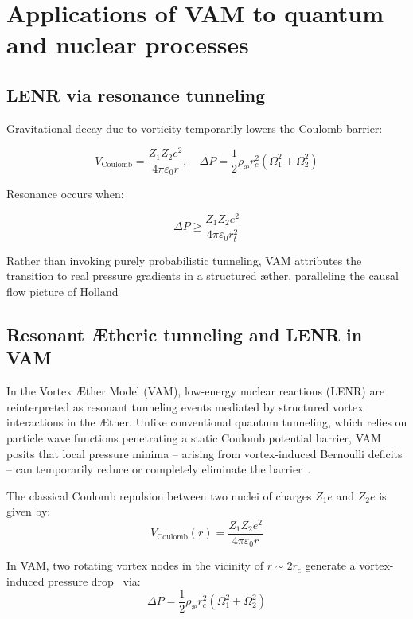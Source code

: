 \section{Applications of VAM to quantum and nuclear processes}
\label{sec:LENR_QED}
\subsection*{LENR via resonance tunneling}

Gravitational decay due to vorticity temporarily lowers the Coulomb barrier:

\begin{equation}
    V_\text{Coulomb} = \frac{Z_1 Z_2 e^2}{4\pi \varepsilon_0 r}, \quad \Delta P = \frac{1}{2} \rho_\text{\ae} r_c^2 (\Omega_1^2 + \Omega_2^2)
\end{equation}

Resonance occurs when:

\begin{equation}
    \Delta P \geq \frac{Z_1 Z_2 e^2}{4\pi \varepsilon_0 r_t^2}
\end{equation}

Rather than invoking purely probabilistic tunneling, VAM attributes the transition to real pressure gradients in a structured æther, paralleling the causal flow picture of Holland~\cite{holland1993quantum}

\subsection*{Resonant Ætheric tunneling and LENR in VAM}

In the Vortex Æther Model (VAM), low-energy nuclear reactions (LENR) are reinterpreted as resonant tunneling events mediated by structured vortex interactions in the Æther. Unlike conventional quantum tunneling, which relies on particle wave functions penetrating a static Coulomb potential barrier, VAM posits that local pressure minima – arising from vortex-induced Bernoulli deficits – can temporarily reduce or completely eliminate the barrier~\cite{Barcelo2011,Volovik2003}.

The classical Coulomb repulsion between two nuclei of charges \( Z_1 e \) and \( Z_2 e \) is given by:
\begin{equation}
    V_\text{Coulomb}(r) = \frac{Z_1 Z_2 e^2}{4\pi \varepsilon_0 r}
\end{equation}

In VAM, two rotating vortex nodes in the vicinity of \( r \sim 2r_c \) generate a vortex-induced pressure drop~\cite{Saffman1992} via:
\begin{equation}
    \Delta P = \frac{1}{2} \rho_\text{\ae} r_c^2 (\Omega_1^2 + \Omega_2^2)
\end{equation}

